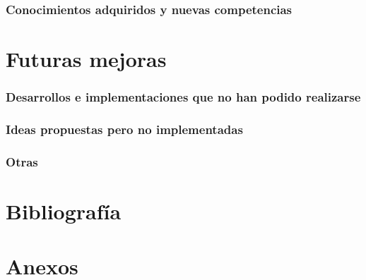 \subsubsection{Conocimientos adquiridos y nuevas competencias}
\section{Futuras mejoras}
\subsubsection{Desarrollos e implementaciones que no han podido realizarse}
\subsubsection{Ideas propuestas pero no implementadas}
\subsubsection{Otras}
\section{Bibliografía}
\section{Anexos}